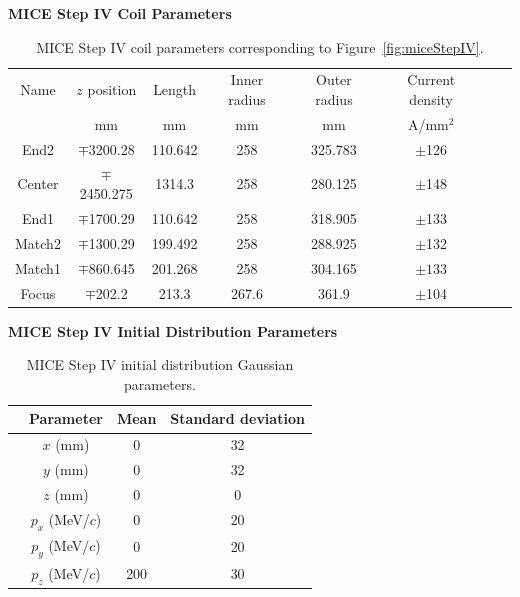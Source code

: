 \begin{table}
\caption*{\textbf{MICE Step IV Coil Parameters}}
\begin{tabularx}{\textwidth}{cccccccc}
\hline \hline
Name & $z$ position & Length & Inner radius & Outer radius & Current density  \vspace{-12pt}\\
 & mm & mm & mm & mm & A/mm$^2$  \\
\hline
	End2 & $\mp$3200.28&110.642&258&325.783&$\pm$126 \vspace{-12pt}\\
	Center&$\mp$2450.275&1314.3&258&280.125&$\pm$148 \vspace{-12pt}\\
	End1 & $\mp$1700.29& 110.642& 258 & 318.905 & $\pm$133 \vspace{-12pt}\\
	Match2 & $\mp$1300.29 & 199.492 & 258 & 288.925 & $\pm$132 \vspace{-12pt}\\
	Match1 & $\mp$860.645 & 201.268 & 258 & 304.165 & $\pm133$ \vspace{-12pt}\\
	Focus & $\mp$202.2 & 213.3 & 267.6 & 361.9 & $\pm$104 \\ 
\hline
\end{tabularx}
\caption[MICE Step IV coil parameters.]{MICE Step IV coil parameters corresponding to Figure~\ref{fig:miceStepIV}.}
\label{tbl:MICE_coil_parameters}
\end{table}

\begin{table}
\caption*{\textbf{MICE Step IV Initial Distribution Parameters}}
\begin{center}
\begin{tabularx}{0.7\textwidth}{p{1cm}ccc}
\hline \hline
&Parameter & Mean & Standard deviation \\
\hline
	&$x$ (mm) & 0 & 32\vspace{-12pt}\\
	&$y$ (mm) & 0 & 32\vspace{-12pt} \\
	&$z$ (mm) & 0 & 0\vspace{-12pt} \\
	&$p_x$ (MeV/$c$) & 0 & 20\vspace{-12pt} \\
	&$p_y$ (MeV/$c$) & 0 & 20\vspace{-12pt} \\
	&$p_z$ (MeV/$c$) & 200 & 30\\
\hline
\end{tabularx}
\end{center}
\caption{MICE Step IV initial distribution Gaussian parameters.}
\label{tbl:MICE_initial_distribution_parameters}
\end{table}

